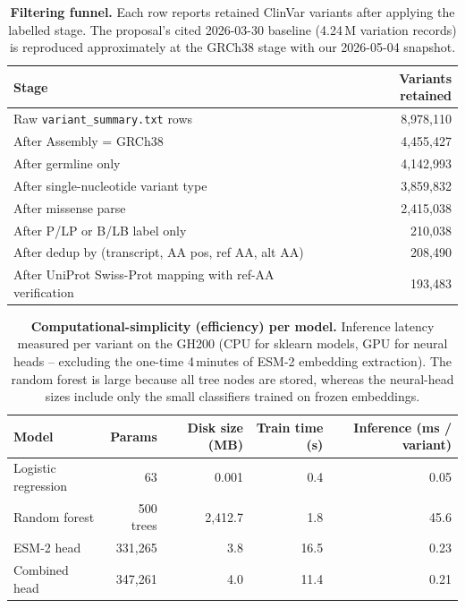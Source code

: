 \documentclass[11pt,letterpaper]{article}
\begin{document}
\begin{table}[h]
\centering
\small
\caption{\textbf{Filtering funnel.} Each row reports retained ClinVar variants after applying the labelled stage. The proposal's cited 2026-03-30 baseline (4.24\,M variation records) is reproduced approximately at the GRCh38 stage with our 2026-05-04 snapshot.}
\label{tab:funnel}
\begin{tabular}{lr}
\toprule
\textbf{Stage} & \textbf{Variants retained} \\
\midrule
Raw \texttt{variant\_summary.txt} rows                      & 8{,}978{,}110 \\
After Assembly = GRCh38                                     & 4{,}455{,}427 \\
After germline only                                         & 4{,}142{,}993 \\
After single-nucleotide variant type                        & 3{,}859{,}832 \\
After missense parse                                        & 2{,}415{,}038 \\
After P/LP or B/LB label only                               &   210{,}038 \\
After dedup by (transcript, AA pos, ref AA, alt AA)         &   208{,}490 \\
After UniProt Swiss-Prot mapping with ref-AA verification   &   193{,}483 \\
\bottomrule
\end{tabular}
\end{table}

\begin{table}[h]
\centering
\small
\caption{\textbf{Computational-simplicity (efficiency) per model.} Inference latency measured per variant on the GH200 (CPU for sklearn models, GPU for neural heads -- excluding the one-time 4\,minutes of ESM-2 embedding extraction). The random forest is large because all tree nodes are stored, whereas the neural-head sizes include only the small classifiers trained on frozen embeddings.}
\label{tab:efficiency}
\begin{tabular}{lrrrr}
\toprule
\textbf{Model} & \textbf{Params} & \textbf{Disk size (MB)} & \textbf{Train time (s)} & \textbf{Inference (ms / variant)} \\
\midrule
Logistic regression & 63       & 0.001          & 0.4          & 0.05 \\
Random forest       & 500 trees & 2{,}412.7      & 1.8          & 45.6 \\
ESM-2 head          & 331{,}265 & 3.8            & 16.5         & 0.23  \\
Combined head       & 347{,}261 & 4.0            & 11.4         & 0.21  \\
\bottomrule
\end{tabular}
\end{table}
\end{document}
